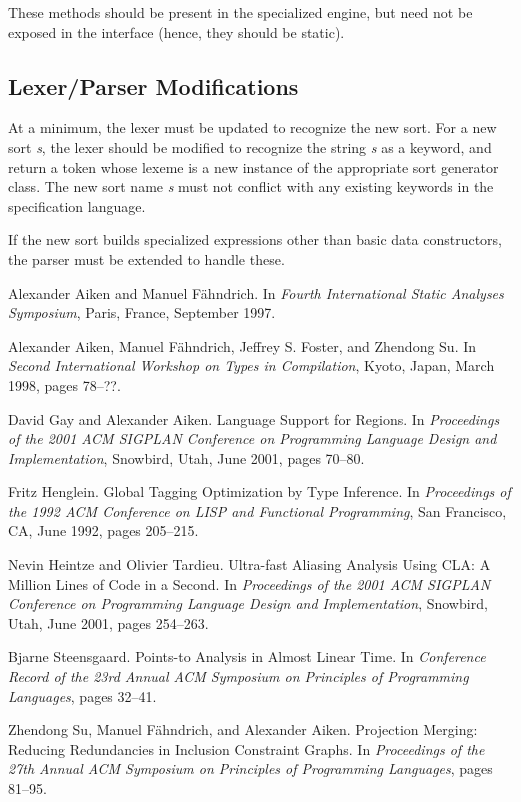 \documentclass{article}
\begin{document}
These methods should be present in the specialized engine, but need not be 
exposed in the interface (hence, they should be static).

\subsection{Lexer/Parser Modifications}

At a minimum, the lexer must be updated to recognize the new sort. For a new
sort \emph{s}, the lexer should be modified to recognize
the string \emph{s} as a keyword, and return a token whose lexeme is a new 
instance of the appropriate sort generator class. The new sort name \emph{s} 
must not conflict with any existing keywords in the specification language.

If the new sort builds specialized expressions other than basic data 
constructors, the parser must be extended to handle these.


\begin{thebibliography}{foo}

 Alexander Aiken and Manuel F\"ahndrich. In {\em Fourth International Static Analyses Symposium}, Paris, France, September 1997.

 Alexander Aiken, Manuel F\"ahndrich, Jeffrey S. Foster, and Zhendong Su. In {\em Second International Workshop on Types in Compilation}, Kyoto, Japan, March 1998, pages 78--??.

 David Gay and Alexander Aiken.  \newblock
{Language Support for Regions}.  \newblock In {\em Proceedings of the
2001 ACM SIGPLAN Conference on Programming Language Design and
Implementation}, Snowbird, Utah, June 2001, pages 70--80.

 Fritz Henglein. \newblock 
{Global Tagging Optimization by Type Inference}. \newblock In {\em Proceedings
of the 1992 ACM Conference on LISP and Functional Programming}, San Francisco,
CA, June 1992, pages 205--215.

 Nevin Heintze and Olivier Tardieu. \newblock
{Ultra-fast Aliasing Analysis Using CLA: A Million Lines of Code in a Second}.
\newblock In {\em Proceedings of the
2001 ACM SIGPLAN Conference on Programming Language Design and
Implementation}, Snowbird, Utah, June 2001, pages 254--263.

 Bjarne Steensgaard. \newblock
{Points-to Analysis in Almost Linear Time}. \newblock In {\em Conference 
Record of the 23rd Annual ACM Symposium on Principles of Programming 
Languages}, pages 32--41.

 Zhendong Su, Manuel F\"ahndrich, and Alexander Aiken. \newblock
{Projection Merging: Reducing Redundancies in Inclusion Constraint Graphs}. 
\newblock In {\em Proceedings of the 27th Annual ACM Symposium on Principles of Programming Languages}, pages 81--95.

\end{thebibliography}
\end{document}
